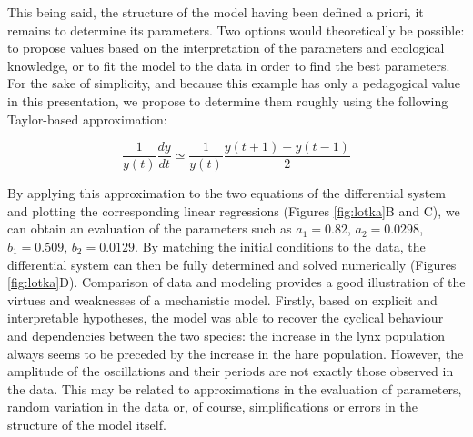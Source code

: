 \documentclass[a4paper,12pt,twoside,onecolumn,openright,final,oldfontcommands]{memoir}
\begin{document}
This being said, the structure of the model having been defined a
priori, it remains to determine its parameters. Two options would
theoretically be possible: to propose values based on the interpretation
of the parameters and ecological knowledge, or to fit the model to the
data in order to find the best parameters. For the sake of simplicity,
and because this example has only a pedagogical value in this
presentation, we propose to determine them roughly using the following
Taylor-based approximation:

\[\dfrac{1}{y(t)} \dfrac{dy}{dt} \simeq \dfrac{1}{y(t)} \dfrac{y(t+1)-y(t-1)}{2}\]

By applying this approximation to the two equations of the differential
system and plotting the corresponding linear regressions (Figures
\ref{fig:lotka}B and C), we can obtain an evaluation of the parameters
such as \(a_1=0.82\), \(a_2=0.0298\), \(b_1=0.509\), \(b_2=0.0129\). By
matching the initial conditions to the data, the differential system can
then be fully determined and solved numerically (Figures
\ref{fig:lotka}D). Comparison of data and modeling provides a good
illustration of the virtues and weaknesses of a mechanistic model.
Firstly, based on explicit and interpretable hypotheses, the model was
able to recover the cyclical behaviour and dependencies between the two
species: the increase in the lynx population always seems to be preceded
by the increase in the hare population. However, the amplitude of the
oscillations and their periods are not exactly those observed in the
data. This may be related to approximations in the evaluation of
parameters, random variation in the data or, of course, simplifications
or errors in the structure of the model itself.
\end{document}
